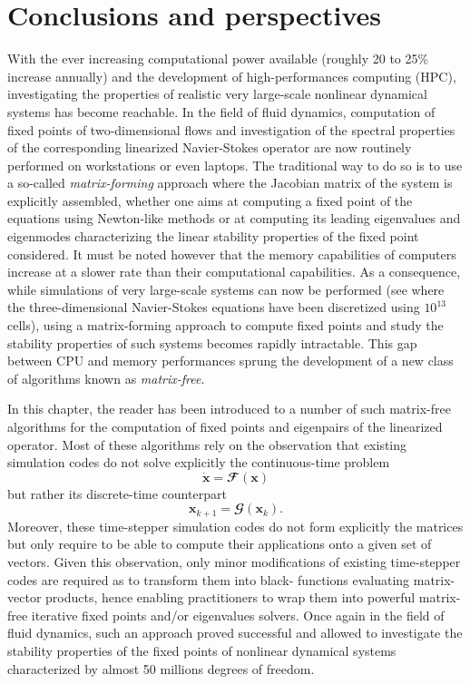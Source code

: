 \section{Conclusions and perspectives}
\label{sec: conclusion}

With the ever increasing computational power available (roughly 20 to 25\% increase annually) and the development of high-performances computing (HPC), investigating the properties of realistic very large-scale nonlinear dynamical systems has become reachable. In the field of fluid dynamics, computation of fixed points of two-dimensional flows and investigation of the spectral properties of the corresponding linearized Navier-Stokes operator are now routinely performed on workstations or even laptops. The traditional way to do so is to use a so-called \emph{matrix-forming} approach where the Jacobian matrix of the system is explicitly assembled, whether one aims at computing a fixed point of the equations using Newton-like methods or at computing its leading eigenvalues and eigenmodes characterizing the linear stability properties of the fixed point considered. It must be noted however that the memory capabilities of computers increase at a slower rate than their computational capabilities. As a consequence, while simulations of very large-scale systems can now be performed (see \cite{rasthofer2017large} where the three-dimensional Navier-Stokes equations have been discretized using $10^{13}$ cells), using a matrix-forming approach to compute fixed points and study the stability properties of such systems becomes rapidly intractable. This gap between CPU and memory performances sprung the development of a new class of algorithms known as \emph{matrix-free}.

In this chapter, the reader has been introduced to a number of such matrix-free algorithms for the computation of fixed points and eigenpairs of the linearized operator. Most of these algorithms rely on the observation that existing simulation codes do not solve explicitly the continuous-time problem
$$\dot{\mathbf{x}} = \mathbfcal{F}(\mathbf{x})$$
but rather its discrete-time counterpart
$$\mathbf{x}_{k+1} = \mathbfcal{G}(\mathbf{x}_k).$$
Moreover, these time-stepper simulation codes do not form explicitly the matrices but only require to be able to compute their applications onto a given set of vectors. Given this observation, only minor modifications of existing time-stepper codes are required as to transform them into black- functions evaluating matrix-vector products, hence enabling practitioners to wrap them into powerful matrix-free iterative fixed points and/or eigenvalues solvers. Once again in the field of fluid dynamics, such an approach proved successful and allowed \cite{jfm:ilak:2012, jfm:loiseau:2014, pof:citro:2015, jfm:bucci:2018} to investigate the stability properties of the fixed points of nonlinear dynamical systems characterized by almost 50 millions degrees of freedom.

